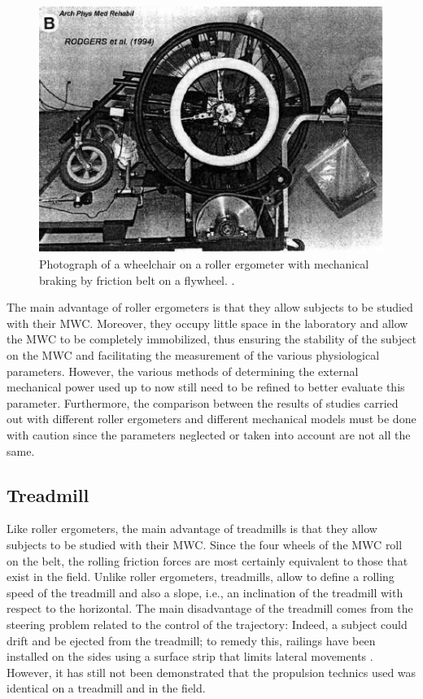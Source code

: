 \begin{figure}[h]
\center
\includegraphics[scale = 25]{images/FRER}
\caption{Photograph of a wheelchair on a roller ergometer with mechanical braking by friction belt on a flywheel. \cite{rodgers1994biomechanics}.}
\label{FRER}
\end{figure}

The main advantage of roller ergometers is that they allow subjects to be studied with their MWC. Moreover, they occupy little space in the laboratory and allow the MWC to be completely immobilized, thus ensuring the stability of the subject on the MWC and facilitating the measurement of the various physiological parameters. However, the various methods of determining the external mechanical power used up to now still need to be refined to better evaluate this parameter. Furthermore, the comparison between the results of studies carried out with different roller ergometers and different mechanical models must be done with caution since the parameters neglected or taken into account are not all the same.

\subsection{Treadmill}
Like roller ergometers, the main advantage of treadmills is that they allow subjects to be studied with their MWC. Since the four wheels of the MWC roll on the belt, the rolling friction forces are most certainly equivalent to those that exist in the field. Unlike roller ergometers, treadmills,  allow to define a rolling speed of the treadmill and also a slope, i.e., an inclination of the treadmill with respect to the horizontal. The main disadvantage of the treadmill comes from the steering problem related to the control of the trajectory: Indeed, a subject could drift and be ejected from the treadmill; to remedy this, railings have been installed on the sides using a surface strip that limits lateral movements \cite{claremont1985model}. However, it has still not been demonstrated that the propulsion technics used was identical on a treadmill and in the field.

